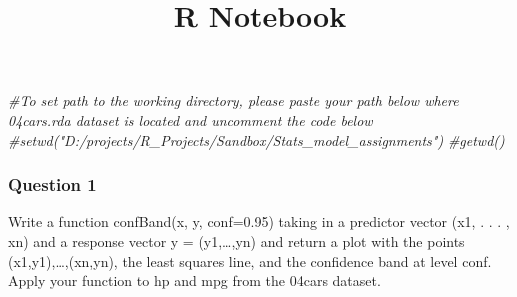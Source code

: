 \documentclass[
]{article}
\title{R Notebook}
\author{}
\date{\vspace{-2.5em}}
\newenvironment{Shaded}{\begin{snugshade}}{\end{snugshade}}
\newcommand{\CommentTok}[1]{\textcolor[rgb]{0.56,0.35,0.01}{\textit{#1}}}
\begin{document}
\maketitle

\begin{Shaded}
\begin{Highlighting}[]
\CommentTok{\#To set path to the working directory, please paste your path below where 04cars.rda dataset is located and uncomment the code below}
\CommentTok{\#setwd("D:/projects/R\_Projects/Sandbox/Stats\_model\_assignments") }
\CommentTok{\#getwd()}
\end{Highlighting}
\end{Shaded}

\hypertarget{question-1}{%
\subsubsection{Question 1}\label{question-1}}

Write a function confBand(x, y, conf=0.95) taking in a predictor vector
(x1, . . . , xn) and a response vector y = (y1,\ldots,yn) and return a
plot with the points (x1,y1),\ldots,(xn,yn), the least squares line, and
the confidence band at level conf. Apply your function to hp and mpg
from the 04cars dataset.
\end{document}
